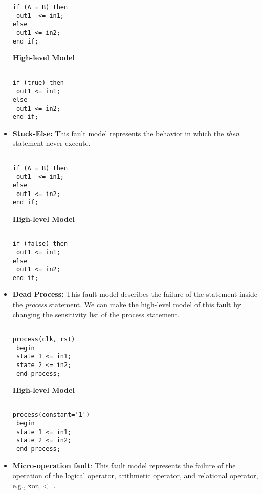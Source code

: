 \begin{itemize}
\begin{lstlisting}[frame=single]
if (A = B) then 
 out1  <= in1;
else
 out1 <= in2;
end if;
\end{lstlisting}


\textbf{High-level Model}
\begin{lstlisting}[frame=single]  % Start your code-block

if (true) then 
 out1 <= in1;
else
 out1 <= in2;
end if;
\end{lstlisting}



\item \textbf{Stuck-Else:} This fault model represents the behavior in which the \textit{then} statement never execute.



\begin{lstlisting}[frame=single]  % Start your code-block

if (A = B) then 
 out1  <= in1;
else
 out1 <= in2;
end if;
\end{lstlisting}


\textbf{High-level Model}
\begin{lstlisting}[frame=single]  % Start your code-block

if (false) then 
 out1 <= in1;
else
 out1 <= in2;
end if;
\end{lstlisting}



\item \textbf{Dead Process:} This fault model describes the failure of the statement inside the \textit{process} statement. We can make the high-level model of this fault by changing the sensitivity list of the process statement.


\begin{lstlisting}[frame=single]  % Start your code-block

process(clk, rst)
 begin
 state 1 <= in1;
 state 2 <= in2;
 end process;
\end{lstlisting}


\textbf{High-level Model}
\begin{lstlisting}[frame=single]  % Start your code-block

process(constant='1')
 begin
 state 1 <= in1;
 state 2 <= in2;
 end process;
\end{lstlisting}



\item \textbf{Micro-operation fault}: This fault model represents the failure of the operation of the logical operator, arithmetic operator, and relational operator, e.g., xor, <=.   



\end{itemize}
